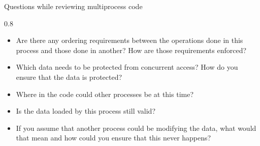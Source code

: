 \documentclass[aspectratio=1610]{beamer}
\newenvironment{centeredblock}[2][0.8\textwidth]
{ %
	\begin{center}
		\begin{varwidth}{#1} %
			\begin{block}{#2}
				\centering
			}
			{ %
			\end{block}
		\end{varwidth}
	\end{center}
}
\begin{document}
	\begin{frame}[fragile]{Questions while reviewing multiprocess code}
		\begin{centeredblock}{}
			\begin{itemize}
				\item Are there any ordering requirements between the operations done in this
				process and those done in another? How are those requirements enforced?
				\item Which data needs to be protected from concurrent access? How do you ensure that the data is protected?
				\item Where in the code could other processes be at this time?
				\item Is the data loaded by this process still valid? 
				\item If you assume that another process could be modifying the data, what would that
				mean and how could you ensure that this never happens?
			\end{itemize}
		\end{centeredblock}
	\end{frame}
	
\end{document}
